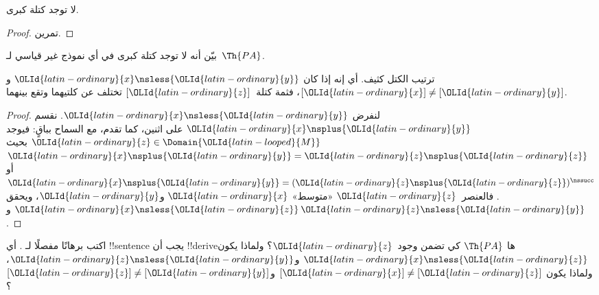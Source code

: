 \documentclass[../../../include/open-logic-section]{subfiles}
\begin{document}
\begin{prop}
لا توجد كتلة كبرى.
\end{prop}

\begin{proof}
تمرين.
\end{proof}

\begin{prob}
بيّن أنه لا توجد كتلة كبرى في أي نموذج غير قياسي لـ~$\Th{PA}$.
\end{prob}

\begin{prop}
ترتيب الكتل كثيف. أي إنه إذا كان ${\OLId{latin-ordinary}{x}} \nsless {\OLId{latin-ordinary}{y}}$ و$[{\OLId{latin-ordinary}{x}}] \neq [{\OLId{latin-ordinary}{y}}]$،
فثمة كتلة~$[{\OLId{latin-ordinary}{z}}]$ تختلف عن كلتيهما وتقع بينهما.
\end{prop}

\begin{proof}
لنفرض ${\OLId{latin-ordinary}{x}} \nsless {\OLId{latin-ordinary}{y}}$. نقسم ${\OLId{latin-ordinary}{x}} \nsplus {\OLId{latin-ordinary}{y}}$ على اثنين،
كما تقدم، مع السماح بباقٍ: فيوجد ${\OLId{latin-ordinary}{z}} \in \Domain{{\OLId{latin-looped}{M}}}$
بحيث ${\OLId{latin-ordinary}{x}} \nsplus {\OLId{latin-ordinary}{y}} = {\OLId{latin-ordinary}{z}} \nsplus {\OLId{latin-ordinary}{z}}$ أو
${\OLId{latin-ordinary}{x}} \nsplus {\OLId{latin-ordinary}{y}} = ({\OLId{latin-ordinary}{z}} \nsplus {\OLId{latin-ordinary}{z}})^\nssucc$.
فالعنصر~${\OLId{latin-ordinary}{z}}$ «متوسط» ${\OLId{latin-ordinary}{x}}$ و${\OLId{latin-ordinary}{y}}$، ويحقق
${\OLId{latin-ordinary}{x}} \nsless {\OLId{latin-ordinary}{z}}$ و${\OLId{latin-ordinary}{z}} \nsless {\OLId{latin-ordinary}{y}}$.
\end{proof}

\begin{prob}
اكتب برهانًا مفصلًا لـ
. أي !!{sentence} يجب أن
!!{derive}ها $\Th{PA}$ كي تضمن وجود~${\OLId{latin-ordinary}{z}}$؟ ولماذا يكون ${\OLId{latin-ordinary}{x}} \nsless {\OLId{latin-ordinary}{z}}$
و${\OLId{latin-ordinary}{z}} \nsless {\OLId{latin-ordinary}{y}}$، ولماذا يكون $[{\OLId{latin-ordinary}{x}}] \neq [{\OLId{latin-ordinary}{z}}]$ و$[{\OLId{latin-ordinary}{z}}] \neq [{\OLId{latin-ordinary}{y}}]$؟
\end{prob}
\end{document}
